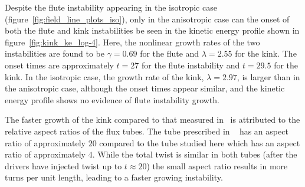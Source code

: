 \documentclass[fleqn,usenatbib]{mnras}
\newcommand{\rs}[2]{{#2}}
\begin{document}
Despite the flute instability appearing in the isotropic
case (figure~\ref{fig:field_line_plots_iso}), only in the
\rs{switching}{anisotropic} case can the onset of both the
flute and kink instabilities be seen in the kinetic
energy profile \rs{}{shown in} figure~\ref{fig:kink_ke_log-4}. \rs{where}{Here,} the nonlinear
growth rates of the two instabilities are found to be $\gamma = 0.69$
for the flute and $\lambda = 2.55$ for the kink. The
onset times are approximately $t=27$ for the flute
instability and \rs{}{$t=29.5$} for
the kink. In the isotropic case, the growth rate of the kink, $\lambda
= 2.97$, is larger than in the \rs{switching}{anisotropic} case,
although the onset times appear similar, and the kinetic energy
profile shows no evidence of \rs{the growth of the flute
instability.}{flute instability growth.} 

The faster growth of the kink compared to that measured in~
\citet{quinnEffectAnisotropicViscosity2020} is \rs{due}{attributed} to
the relative aspect ratios of the flux tubes. The tube prescribed in
\rs{chapter~}{}~\citep{quinnEffectAnisotropicViscosity2020} has an aspect
ratio of approximately $20$ compared to the tube studied here which
has an aspect ratio of approximately $4$. While the total twist is
similar in both tubes (after the drivers have injected twist up to
$t\approx20$) the small aspect ratio results in more turns per unit
length, \rs{resulting in}{leading to} a faster growing instability. 
\end{document}
